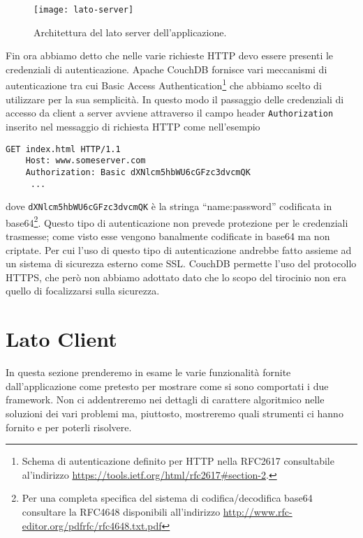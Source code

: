		\begin{figure}[h]
			\centering
			\texttt{[image: lato-server]}
			\caption{
				Architettura del lato server dell'applicazione.
			}
			\label{fig:latoserver}
		\end{figure}
		
		Fin ora abbiamo detto che nelle varie richieste HTTP devo essere presenti
		le credenziali di autenticazione. Apache CouchDB\texttrademark{} fornisce
		vari meccanismi di autenticazione tra cui Basic Access Authentication\footnote{
		Schema di autenticazione definito per HTTP nella RFC2617 consultabile al'indirizzo
		\url{https://tools.ietf.org/html/rfc2617\#section-2}.}
		che abbiamo scelto di utilizzare per la sua semplicità. In questo modo il
		passaggio delle credenziali di accesso da client a server avviene attraverso 
		il campo header \texttt{Authorization} inserito nel messaggio di richiesta HTTP 
		come nell'esempio 
		\begin{lstlisting}[language=http]
	GET index.html HTTP/1.1
	Host: www.someserver.com
	Authorization: Basic dXNlcm5hbWU6cGFzc3dvcmQK
	 ...
		\end{lstlisting}
		dove \texttt{dXNlcm5hbWU6cGFzc3dvcmQK} è la stringa ``name:password'' 
		codificata in base64\footnote{Per una completa specifica del sistema di
		codifica/decodifica base64 consultare la RFC4648 disponibili all'indirizzo
		\url{http://www.rfc-editor.org/pdfrfc/rfc4648.txt.pdf}}.
		Questo tipo di autenticazione non prevede protezione per le credenziali 
		trasmesse; come visto esse vengono banalmente codificate in base64 ma non 
		criptate. Per cui l'uso di questo tipo di 
		autenticazione andrebbe fatto assieme ad un sistema di sicurezza esterno 
		come SSL\citep{Web:RFC2617}. CouchDB permette l'uso del protocollo HTTPS, 
		che però non abbiamo adottato dato che lo scopo del tirocinio non era quello di focalizzarsi 
		sulla sicurezza.
	
	
	\section{Lato Client}
		In questa sezione prenderemo in esame le varie funzionalità fornite
		dall'applicazione come pretesto per mostrare come si sono
		comportati i due framework. Non ci addentreremo
		nei dettagli di carattere algoritmico nelle soluzioni dei vari problemi ma,
		piuttosto, mostreremo quali strumenti ci hanno fornito \tisdk{} e \pg{}
		per poterli risolvere.
		
